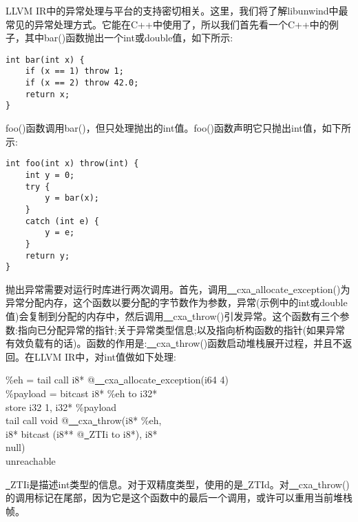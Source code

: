 LLVM IR中的异常处理与平台的支持密切相关。这里，我们将了解libunwind中最常见的异常处理方式。它能在C++中使用了，所以我们首先看一个C++中的例子，其中bar()函数抛出一个int或double值，如下所示:\par

\begin{lstlisting}[caption={}]
int bar(int x) {
	if (x == 1) throw 1;
	if (x == 2) throw 42.0;
	return x;
}
\end{lstlisting}

foo()函数调用bar()，但只处理抛出的int值。foo()函数声明它只抛出int值，如下所示:\par

\begin{lstlisting}[caption={}]
int foo(int x) throw(int) {
	int y = 0;
	try {
		y = bar(x);
	}
	catch (int e) {
		y = e;
	}
	return y;
}
\end{lstlisting}

抛出异常需要对运行时库进行两次调用。首先，调用\underline{~~}cxa\underline{~}allocate\underline{~}exception()为异常分配内存，这个函数以要分配的字节数作为参数，异常(示例中的int或double值)会复制到分配的内存中，然后调用\underline{~~}cxa\underline{~}throw()引发异常。这个函数有三个参数:指向已分配异常的指针;关于异常类型信息;以及指向析构函数的指针(如果异常有效负载有的话)。函数的作用是:\underline{~~}cxa\underline{~}throw()函数启动堆栈展开过程，并且不返回。在LLVM IR中，对int值做如下处理:\par

\begin{tcolorbox}[colback=white,colframe=black]
\%eh = tail call i8* @\underline{~~}cxa\underline{~}allocate\underline{~}exception(i64 4) \\
\%payload = bitcast i8* \%eh to i32* \\
store i32 1, i32* \%payload \\
tail call void @\underline{~~}cxa\underline{~}throw(i8* \%eh, \\
\hspace*{3cm}i8* bitcast (i8** @\underline{~}ZTIi to i8*), i8* \\
\hspace*{3cm}null) \\
unreachable
\end{tcolorbox}

\underline{~}ZTIi是描述int类型的信息。对于双精度类型，使用的是\underline{~}ZTId。对\underline{~~}cxa\underline{~}throw()的调用标记在尾部，因为它是这个函数中的最后一个调用，或许可以重用当前堆栈帧。\par

